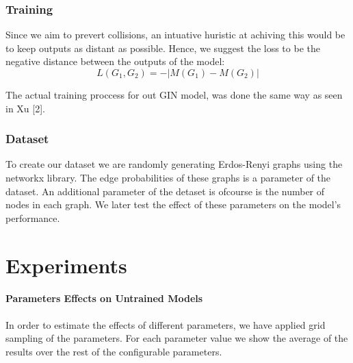 \documentclass{article}
\begin{document}
\section*{Training}
Since we aim to prevert collisions, an intuative huristic at achiving this would be to keep
outputs as distant as possible.
Hence, we suggest the loss to be the negative distance between the outputs of the model:
\[
    L(G_1,G_2)=-|M(G_1)-M(G_2)|    
\]

The actual training proccess for out GIN model, was done the same way as seen in  Xu [2].

\section*{Dataset}
To create our dataset we are randomly generating Erdos-Renyi graphs using the networkx library. The edge probabilities of
these graphs is a parameter of the dataset. An additional parameter of the detaset is ofcourse is the number
of nodes in each graph. We later test the effect of these parameters on the model's performance.\\

\part*{Experiments}
\subsection*{Parameters Effects on Untrained Models}
In order to estimate the effects of different parameters, we have applied grid sampling of the parameters.
For each parameter value we show the average of the results over the rest of the configurable parameters.
\end{document}

